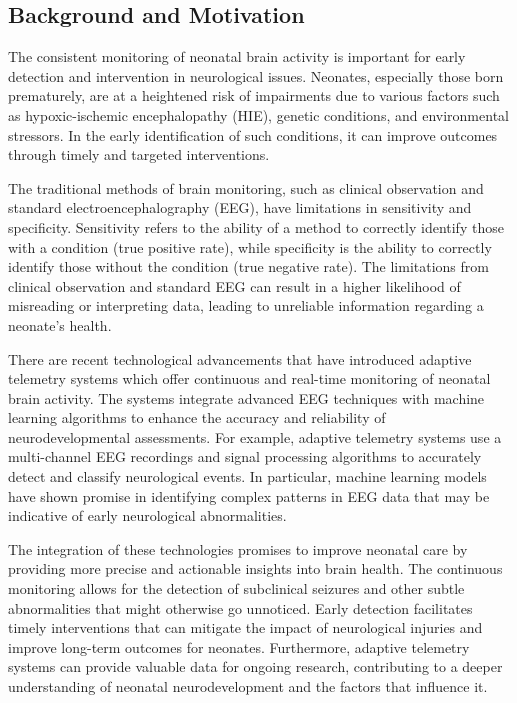 \documentclass[12pt,journal,compsoc]{IEEEtran}
\begin{document}
\subsection{Background and Motivation}
The consistent monitoring of neonatal brain activity is important for early detection and intervention in neurological issues. Neonates, especially those born prematurely, are at a heightened risk of impairments due to various factors such as hypoxic-ischemic encephalopathy (HIE), genetic conditions, and environmental stressors. In the early identification of such conditions, it can improve outcomes through timely and targeted interventions.

The traditional methods of brain monitoring, such as clinical observation and standard electroencephalography (EEG), have limitations in sensitivity and specificity. Sensitivity refers to the ability of a method to correctly identify those with a condition (true positive rate), while specificity is the ability to correctly identify those without the condition (true negative rate). The limitations from clinical observation and standard EEG can result in a higher likelihood of misreading or interpreting data, leading to unreliable information regarding a neonate's health. 

There are recent technological advancements that have introduced adaptive telemetry systems which offer continuous and real-time monitoring of neonatal brain activity. The systems integrate advanced EEG techniques with machine learning algorithms to enhance the accuracy and reliability of neurodevelopmental assessments. For example, adaptive telemetry systems use a multi-channel EEG recordings and signal processing algorithms to accurately detect and classify neurological events. In particular, machine learning models have shown promise in identifying complex patterns in EEG data that may be indicative of early neurological abnormalities.

The integration of these technologies promises to improve neonatal care by providing more precise and actionable insights into brain health. The continuous monitoring allows for the detection of subclinical seizures and other subtle abnormalities that might otherwise go unnoticed. Early detection facilitates timely interventions that can mitigate the impact of neurological injuries and improve long-term outcomes for neonates. Furthermore, adaptive telemetry systems can provide valuable data for ongoing research, contributing to a deeper understanding of neonatal neurodevelopment and the factors that influence it.
\end{document}
